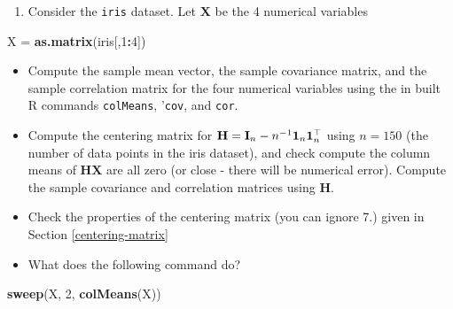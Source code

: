 \documentclass[]{book}
\newenvironment{Shaded}{\begin{snugshade}}{\end{snugshade}}
\newcommand{\CommentTok}[1]{\textcolor[rgb]{0.56,0.35,0.01}{\textit{#1}}}
\newcommand{\DecValTok}[1]{\textcolor[rgb]{0.00,0.00,0.81}{#1}}
\newcommand{\KeywordTok}[1]{\textcolor[rgb]{0.13,0.29,0.53}{\textbf{#1}}}
\newcommand{\NormalTok}[1]{#1}
\newcommand{\OperatorTok}[1]{\textcolor[rgb]{0.81,0.36,0.00}{\textbf{#1}}}
\newcommand{\StringTok}[1]{\textcolor[rgb]{0.31,0.60,0.02}{#1}}
\providecommand{\tightlist}{%
  \setlength{\itemsep}{0pt}\setlength{\parskip}{0pt}}
\theoremstyle{definition}
\theoremstyle{definition}
\theoremstyle{definition}
\theoremstyle{remark}
\begin{document}
\begin{enumerate}
\def\labelenumi{\arabic{enumi}.}
\setcounter{enumi}{1}
\tightlist
\item
  Consider the \texttt{iris} dataset. Let \(\mathbf X\) be the 4 numerical variables
\end{enumerate}

\begin{Shaded}
\begin{Highlighting}[]
\NormalTok{X =}\StringTok{ }\KeywordTok{as.matrix}\NormalTok{(iris[,}\DecValTok{1}\OperatorTok{:}\DecValTok{4}\NormalTok{])}
\end{Highlighting}
\end{Shaded}

\begin{itemize}
\item
  Compute the sample mean vector, the sample covariance matrix, and the sample correlation matrix for the four numerical variables using the in built R commands \texttt{colMeans}, '\texttt{cov}, and \texttt{cor}.
\item
  Compute the centering matrix for
  \({\bf H}={\bf I}_n-n^{-1}{\bf 1}_n {\bf 1}_n^\top\)
  using \(n=150\) (the number of data points in the iris dataset), and check compute the column means of \(\mathbf H\mathbf X\) are all zero (or close - there will be numerical error). Compute the sample covariance and correlation matrices using \(\mathbf H\).
\end{itemize}

\begin{Shaded}
\end{Shaded}

\begin{itemize}
\item
  Check the properties of the centering matrix (you can ignore 7.) given in Section \ref{centering-matrix}
\item
  What does the following command do?
\end{itemize}

\begin{Shaded}
\begin{Highlighting}[]
\KeywordTok{sweep}\NormalTok{(X, }\DecValTok{2}\NormalTok{, }\KeywordTok{colMeans}\NormalTok{(X))}
\end{Highlighting}
\end{Shaded}
\end{document}
